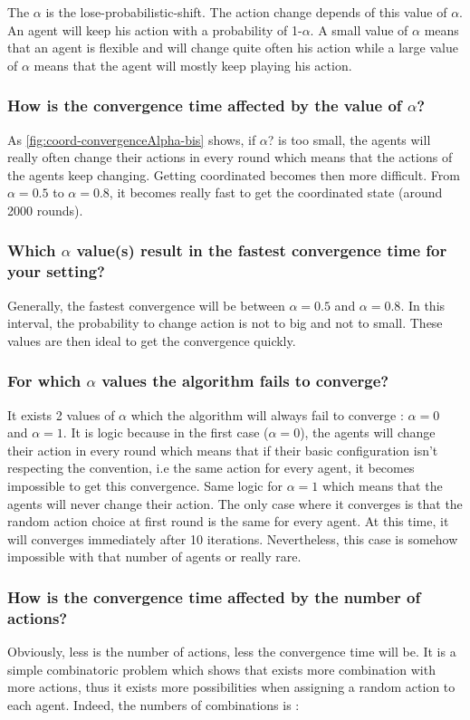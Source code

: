 \documentclass{article}
\begin{document}
The $\alpha$ is the lose-probabilistic-shift. The action change depends of this value of $\alpha$. An agent will keep his action with a probability of 1-$\alpha$. A small value of $\alpha$ means that an agent is flexible and will change quite often his action while a large value of $\alpha$ means that the agent will mostly keep playing his action. 

\subsubsection{How is the convergence time affected by the value of $\alpha$?} 
As \autoref{fig:coord-convergenceAlpha-bis} shows, if $\alpha$? is too small, the agents will really often change their actions in every round which means that the actions of the agents keep changing. Getting coordinated becomes then more difficult. From $\alpha = 0.5$ to $\alpha = 0.8$, it becomes really fast to get the coordinated state (around 2000 rounds).   

\subsubsection{Which $\alpha$ value(s) result in the fastest convergence time for your setting?}
Generally, the fastest convergence will be between $\alpha = 0.5$ and $\alpha = 0.8$. In this interval, the probability to change action is not to big and not to small. These values are then ideal to get the convergence quickly. 

\subsubsection{For which $\alpha$ values the algorithm fails to converge?}
It exists 2 values of $\alpha$ which the algorithm will always fail to converge : $\alpha = 0$ and $\alpha = 1$. It is logic because in the first case ($\alpha = 0$), the agents will change their action in every round which means that if their basic configuration isn't respecting the convention, i.e the same action for every agent, it becomes impossible to get this convergence. Same logic for $\alpha = 1$ which means that the agents will never change their action. The only case where it converges is that the random action choice at first round is the same for every agent. At this time, it will converges immediately after 10 iterations. Nevertheless, this case is somehow impossible with that number of agents or really rare. 

\subsubsection{How is the convergence time affected by the number of actions?}
Obviously, less is the number of actions, less the convergence time will be. It is a simple combinatoric problem which shows that exists more combination with more actions, thus it exists more possibilities when assigning a random action to each agent. Indeed, the numbers of combinations is : 
\end{document}
